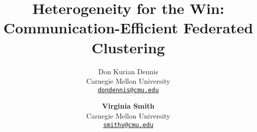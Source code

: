 \documentclass{article}
\title{{Heterogeneity for the Win: \\Communication-Efficient Federated Clustering}}
\author{
  Don Kurian Dennis \\ \small Carnegie Mellon University \\ \footnotesize
  \texttt{\href{mailto:dondennis@cmu.edu}{dondennis@cmu.edu}} \and
  \textbf{Virginia Smith} \\ \small Carnegie Mellon University \\ \footnotesize
  \texttt{\href{mailto:smithv@cmu.edu}{smithv@cmu.edu}}
}
\begin{document}
\maketitle
\begin{abstract}
\end{abstract}
%
%
%
%

\newpage



\newpage
%
%
\end{document}
